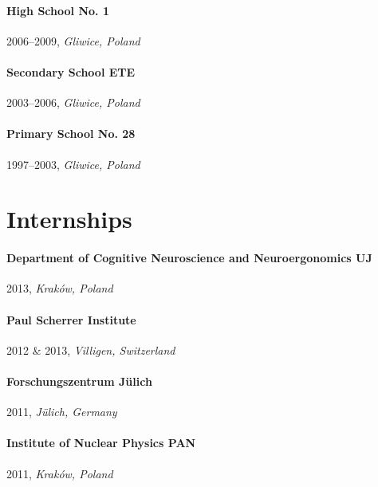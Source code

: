 \paragraph{High School No. 1} 2006--2009, \emph{Gliwice, Poland}

\paragraph{Secondary School ETE} 2003--2006, \emph{Gliwice, Poland}

\paragraph{Primary School No. 28} 1997--2003, \emph{Gliwice, Poland}









\section*{Internships}
\paragraph{Department of Cognitive Neuroscience and Neuroergonomics UJ} 2013, \emph{Kraków, Poland}
\paragraph{Paul Scherrer Institute} 2012 \& 2013, \emph{Villigen, Switzerland}
\paragraph{Forschungszentrum Jülich} 2011, \emph{Jülich, Germany}
\paragraph{Institute of Nuclear Physics PAN} 2011, \emph{Kraków, Poland}



\endgroup
